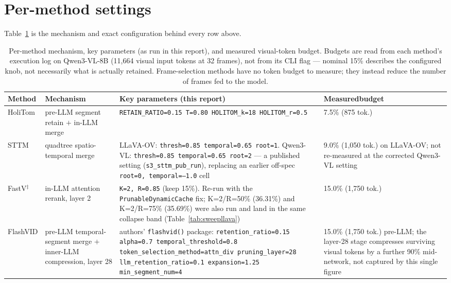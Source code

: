 \documentclass[11pt]{article}
\begin{document}
\section{Per-method settings}
\label{sec:permethod}

Table~\ref{tab:permethod} is the mechanism and exact configuration behind
every row above.

\begin{table}[H]
  \centering
  \footnotesize
  \caption{Per-method mechanism, key parameters (as run in this report), and
  measured visual-token budget. Budgets are read from each method's
  execution log on Qwen3-VL-8B (11{,}664 visual input tokens at 32 frames),
  not from its CLI flag --- nominal 15\% describes the configured knob, not
  necessarily what is actually retained. Frame-selection methods have no
  token budget to measure; they instead reduce the number of frames fed to
  the model.}
  \label{tab:permethod}
  \begin{tabular}{p{2.1cm}p{3.9cm}p{4.8cm}p{2.7cm}}
    \toprule
    Method & Mechanism & Key parameters (this report) & Measured\newline budget \\
    \midrule
    HoliTom & pre-LLM segment retain $+$ in-LLM merge & \texttt{RETAIN\_RATIO=0.15 T=0.80 HOLITOM\_k=18 HOLITOM\_r=0.5} & 7.5\% (875 tok.) \\
    STTM & quadtree spatio-temporal merge & LLaVA-OV: \texttt{thresh=0.85 temporal=0.65 root=1}. Qwen3-VL: \texttt{thresh=0.85 temporal=0.65 root=2} --- a published setting (\texttt{s3\_sttm\_pub\_run}), replacing an earlier off-spec \texttt{root=0, temporal=--1.0} cell & 9.0\% (1{,}050 tok.) on LLaVA-OV; not re-measured at the corrected Qwen3-VL setting \\
    FastV$^{\ddagger}$ & in-LLM attention rerank, layer 2 & \texttt{K=2, R=0.85} (keep 15\%). Re-run with the \texttt{PrunableDynamicCache} fix; K=2/R=50\% (36.31\%) and K=2/R=75\% (35.69\%) were also run and land in the same collapse band (Table~\ref{tab:sweepllava}) & 15.0\% (1{,}750 tok.) \\
    FlashVID & pre-LLM temporal-segment merge $+$ inner-LLM compression, layer 28 & authors' \texttt{flashvid()} package: \texttt{retention\_ratio=0.15 alpha=0.7 temporal\_threshold=0.8 token\_selection\_method=attn\_div pruning\_layer=28 llm\_retention\_ratio=0.1 expansion=1.25 min\_segment\_num=4} & 15.0\% (1{,}750 tok.) pre-LLM; the layer-28 stage compresses surviving visual tokens by a further 90\% mid-network, not captured by this single figure \\

\end{tabular}
\end{table}
\end{document}
